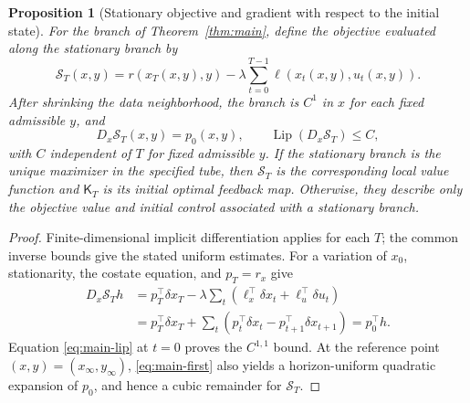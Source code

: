 \documentclass[twocolumn,nameyear,amsthm]{autart}
\newcommand{\Kfb}{\mathsf K}
\newcommand{\xinf}{x_\infty}
\numberwithin{equation}{section}
\newtheorem{proposition}[theorem]{Proposition}
\begin{document}
\begin{proposition}[Stationary objective and gradient with respect to the initial state]
\label{prop:critical-value}
For the branch of Theorem~\ref{thm:main}, define the objective evaluated along
the stationary branch by
\begin{equation}\label{eq:stationary-action}
 \mathscr S_T(x,y)=r(x_T(x,y),y)
 -\lambda\sum_{t=0}^{T-1}\ell(x_t(x,y),u_t(x,y)).
\end{equation}
After shrinking the data neighborhood, the branch is $C^1$ in $x$ for each
fixed admissible $y$, and
\begin{equation}\label{eq:critical-value-gradient}
 D_x\mathscr S_T(x,y)=p_0(x,y),\qquad
 \operatorname{Lip}(D_x\mathscr S_T)\le C,
\end{equation}
with $C$ independent of $T$ for fixed admissible $y$.
If the stationary branch is the unique maximizer in the specified tube, then
$\mathscr S_T$ is the corresponding local value function and $\Kfb_T$ is its
initial optimal feedback map.  Otherwise, they describe only the objective
value and initial control associated with a stationary branch.
\end{proposition}

\begin{proof}
Finite-dimensional implicit differentiation applies for each $T$; the common
inverse bounds give the stated uniform estimates.  For a variation of $x_0$,
stationarity, the costate equation, and $p_T=r_x$ give
\[
\begin{aligned}
D_x\mathscr S_T h
&=p_T^\top\delta x_T-\lambda\sum_t
 (\ell_x^\top\delta x_t+\ell_u^\top\delta u_t)\\
&=p_T^\top\delta x_T+\sum_t
 (p_t^\top\delta x_t-p_{t+1}^\top\delta x_{t+1})=p_0^\top h.
\end{aligned}
\]
Equation \eqref{eq:main-lip} at $t=0$ proves the $C^{1,1}$ bound.  At the
reference point $(x,y)=(\xinf,y_\infty)$, \eqref{eq:main-first} also yields a horizon-uniform quadratic
expansion of $p_0$, and hence a cubic remainder for $\mathscr S_T$.
\end{proof}
\end{document}
